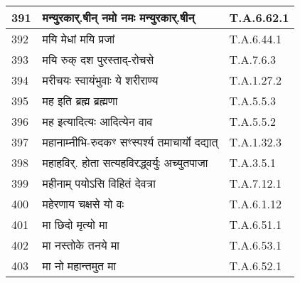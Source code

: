 \documentclass[17pt]{extarticle}
\begin{document}
\begin{longtable}{||p{0.4in}||p{4.9in}||p{0.9in}||}
    391 & मन्युरकार्.षीन् नमो नमः मन्युरकार्.षीन् & T.A.6.62.1       \\
    
    \hline
        
    392 & मयि मेधां मयि प्रजां & T.A.6.44.1       \\
    
    \hline
        
    393 & मयि रुक् दश पुरस्ताद्{-}रोचसे & T.A.7.6.3       \\
    
    \hline
        
    394 & मरीचयः स्वायंभुवाः ये शरीराण्य & T.A.1.27.2       \\
    
    \hline
        
    395 & मह इति ब्रह्म ब्रह्मणा & T.A.5.5.3       \\
    
    \hline
        
    396 & मह इत्यादित्यः आदित्येन वाव & T.A.5.5.2       \\
    
    \hline
        
    397 & महानाम्नीभि{-}रुदकꣳ सꣳस्पर्श्य तमाचार्यो दद्यात् & T.A.1.32.3       \\
    
    \hline
        
    398 & महाहविर्. होता सत्यहविरद्ध्वर्युः अच्युतपाजा & T.A.3.5.1       \\
    
    \hline
        
    399 & महीनाम् पयोऽसि विहितं देवत्रा & T.A.7.12.1       \\
    
    \hline
        
    400 & महेरणाय चक्षसे यो वः & T.A.6.1.12       \\
    
    \hline
        
    401 & मा छिदो मृत्यो मा & T.A.6.51.1       \\
    
    \hline
        
    402 & मा नस्तोके तनये मा & T.A.6.53.1       \\
    
    \hline
        
    403 & मा नो महान्तमुत मा & T.A.6.52.1       \\
    

\end{longtable}
\end{document}
